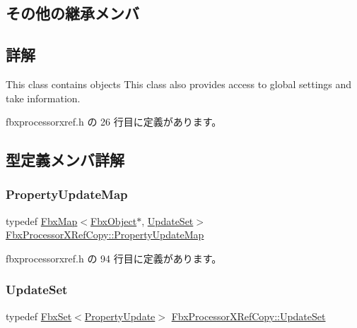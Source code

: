 \subsection*{その他の継承メンバ}


\subsection{詳解}
This class contains objects This class also provides access to global settings and take information. 

 fbxprocessorxref.\+h の 26 行目に定義があります。



\subsection{型定義メンバ詳解}
\mbox{\label{class_fbx_processor_x_ref_copy_af0408f51b60aa6c9fb8aab6e73f57eb7}} 
\subsubsection{\texorpdfstring{Property\+Update\+Map}{PropertyUpdateMap}}
{\footnotesize\ttfamily typedef \hyperlink{class_fbx_map}{Fbx\+Map}$<$\hyperlink{class_fbx_object}{Fbx\+Object}$\ast$, \hyperlink{class_fbx_processor_x_ref_copy_aa745209208dc5e21926fa7d4dde84afb}{Update\+Set}$>$ \hyperlink{class_fbx_processor_x_ref_copy_af0408f51b60aa6c9fb8aab6e73f57eb7}{Fbx\+Processor\+X\+Ref\+Copy\+::\+Property\+Update\+Map}}



 fbxprocessorxref.\+h の 94 行目に定義があります。

\mbox{\label{class_fbx_processor_x_ref_copy_aa745209208dc5e21926fa7d4dde84afb}} 
\subsubsection{\texorpdfstring{Update\+Set}{UpdateSet}}
{\footnotesize\ttfamily typedef \hyperlink{class_fbx_set}{Fbx\+Set}$<$\hyperlink{struct_fbx_processor_x_ref_copy_1_1_property_update}{Property\+Update}$>$ \hyperlink{class_fbx_processor_x_ref_copy_aa745209208dc5e21926fa7d4dde84afb}{Fbx\+Processor\+X\+Ref\+Copy\+::\+Update\+Set}}



